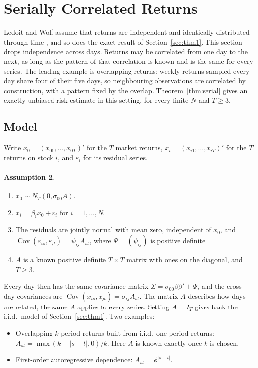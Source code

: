 \section{Serially Correlated Returns}\label{sec:thm2}

Ledoit and Wolf assume that returns are independent and identically distributed through time \citep[Assumption~1]{ledoit2003}, and so does the exact result of Section~\ref{sec:thm1}. This section drops independence across days. Returns may be correlated from one day to the next, as long as the pattern of that correlation is known and is the same for every series. The leading example is overlapping returns: weekly returns sampled every day share four of their five days, so neighbouring observations are correlated by construction, with a pattern fixed by the overlap. Theorem~\ref{thm:serial} gives an exactly unbiased risk estimate in this setting, for every finite $N$ and $T \geq 3$.

\subsection{Model}

Write $x_0 = (x_{01}, \dots, x_{0T})'$ for the $T$ market returns, $x_i = (x_{i1}, \dots, x_{iT})'$ for the $T$ returns on stock $i$, and $\varepsilon_i$ for its residual series.

\paragraph{Assumption 2.}
\begin{enumerate}
  \item[(a)] $x_0 \sim N_T(0, \sigma_{00} A)$.
  \item[(b)] $x_i = \beta_i x_0 + \varepsilon_i$ for $i = 1, \dots, N$.
  \item[(c)] The residuals are jointly normal with mean zero, independent of $x_0$, and $\operatorname{Cov}(\varepsilon_{is}, \varepsilon_{jt}) = \psi_{ij} A_{st}$, where $\Psi = (\psi_{ij})$ is positive definite.
  \item[(d)] $A$ is a known positive definite $T \times T$ matrix with ones on the diagonal, and $T \geq 3$.
\end{enumerate}

Every day then has the same covariance matrix $\Sigma = \sigma_{00}\beta\beta' + \Psi$, and the cross-day covariances are $\operatorname{Cov}(x_{is}, x_{jt}) = \sigma_{ij} A_{st}$. The matrix $A$ describes how days are related; the same $A$ applies to every series. Setting $A = I_T$ gives back the i.i.d.\ model of Section~\ref{sec:thm1}. Two examples:
\begin{itemize}
  \item Overlapping $k$-period returns built from i.i.d.\ one-period returns: $A_{st} = \max(k - |s - t|, 0)/k$. Here $A$ is known exactly once $k$ is chosen.
  \item First-order autoregressive dependence: $A_{st} = \phi^{|s-t|}$.
\end{itemize}

